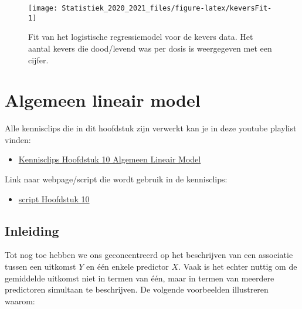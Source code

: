 \documentclass[
  12pt,dutch,coursenotes]{book}
\providecommand{\tightlist}{%
  \setlength{\itemsep}{0pt}\setlength{\parskip}{0pt}}
\theoremstyle{definition}
\theoremstyle{definition}
\theoremstyle{definition}
\theoremstyle{remark}
\begin{document}
\begin{figure}

{\centering \texttt{[image: Statistiek\_2020\_2021\_files/figure-latex/keversFit-1]} 

}

\caption{Fit van het logistische regressiemodel voor de kevers data. Het aantal kevers die dood/levend was per dosis is weergegeven met een cijfer.}\label{fig:keversFit}
\end{figure}

\hypertarget{chap:glm}{%
\chapter{Algemeen lineair model}\label{chap:glm}}

Alle kennisclips die in dit hoofdstuk zijn verwerkt kan je in deze youtube playlist vinden:

\begin{itemize}
\tightlist
\item
  \href{https://www.youtube.com/playlist?list=PLZH1hP8_LbJLuEaRpvAkW7oQLCCjHqUS4}{Kennisclips Hoofdstuk 10 Algemeen Lineair Model}
\end{itemize}

Link naar webpage/script die wordt gebruik in de kennisclips:

\begin{itemize}
\tightlist
\item
  \href{https://statomics.github.io/sbc20/rmd/10-MultipleRegression.html}{script Hoofdstuk 10}
\end{itemize}

\hypertarget{inleiding-9}{%
\section{Inleiding}\label{inleiding-9}}

Tot nog toe hebben we ons geconcentreerd op het beschrijven van een
associatie tussen een uitkomst \(Y\) en één enkele predictor \(X\).
Vaak is het echter nuttig om de gemiddelde uitkomst niet in termen van
één, maar in termen van meerdere predictoren simultaan te beschrijven.
De volgende voorbeelden illustreren waarom:
\end{document}
